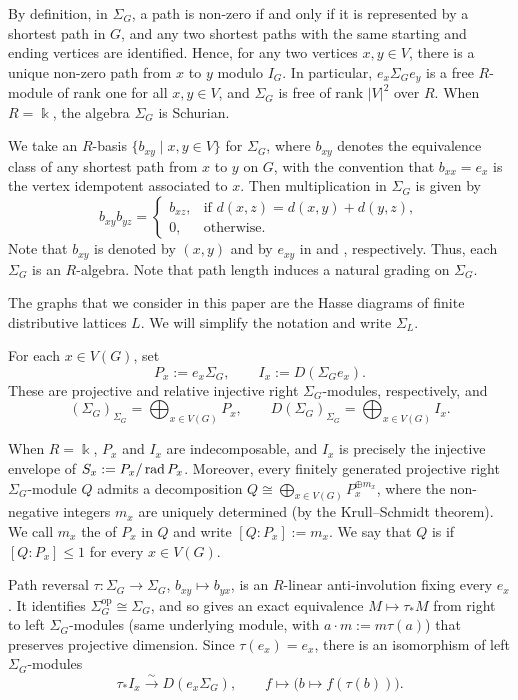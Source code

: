 \documentclass[a4paper,leqno]{amsart}
\begin{document}
By definition, in $\Sigma_G$, a path is non-zero if and only if it is represented by a shortest path in $G$, and any two shortest paths with the same starting and ending vertices are identified. Hence, for any two vertices $x,y\in V$, there is a unique non-zero path from $x$ to $y$ modulo $I_G$. In particular, $e_x\Sigma_Ge_y$ is a free $R$-module of rank one for all $x,y\in V$, and $\Sigma_G$ is free of rank $|V|^2$ over $R$. When $R=\Bbbk$, the algebra $\Sigma_G$ is Schurian.

We take an $R$-basis $\{b_{xy}\mid x,y\in V\}$ for $\Sigma_G$, where $b_{xy}$ denotes the equivalence class of any shortest path from $x$ to $y$ on $G$, with the convention that $b_{xx}=e_x$ is the vertex idempotent associated to $x$. Then multiplication in $\Sigma_G$ is given by
$$
b_{xy}b_{yz}=
\begin{cases}
b_{xz}, & \text{if } d(x,z)=d(x,y)+d(y,z),\\
0, & \text{otherwise}.
\end{cases}
$$
Note that $b_{xy}$ is denoted by $(x,y)$ and by $e_{xy}$ in \cite{AI24} and \cite{AW24}, respectively. Thus, each $\Sigma_G$ is an $R$-algebra.
Note that path length induces a natural grading on $\Sigma_G$. 

The graphs that we consider in this paper are the Hasse diagrams of finite distributive lattices $L$.  We will simplify the notation and write $\Sigma_L$.



For each $x\in V(G)$, set
\[
 P_x:=e_x\Sigma_G,
 \qquad
 I_x:=D(\Sigma_G e_x).
\]
These are projective and relative injective right $\Sigma_G$-modules, respectively, and
\[
 (\Sigma_G)_{\Sigma_G}=\bigoplus_{x\in V(G)}P_x,
 \qquad
 D(\Sigma_G)_{\Sigma_G}=\bigoplus_{x\in V(G)}I_x.
\]

When $R=\Bbbk$, $P_x$ and $I_x$ are indecomposable, and $I_x$ is precisely the injective envelope of $S_x:=P_x/\operatorname{rad} P_x$.
Moreover, every finitely generated projective right $\Sigma_G$-module $Q$ admits a decomposition $Q\cong\bigoplus_{x\in V(G)}P_x^{\oplus m_x}$, where the non-negative integers $m_x$ are uniquely determined (by the Krull--Schmidt theorem).  We call $m_x$ the  of $P_x$ in $Q$ and write $[Q:P_x]:=m_x$. We say that $Q$ is  if $[Q:P_x]\leq1$ for every $x\in V(G)$.

Path reversal $\tau\colon\Sigma_G\to\Sigma_G$, $b_{xy}\mapsto b_{yx}$, is an $R$-linear anti-involution fixing every $e_x$. It identifies $\Sigma_G^{\operatorname{op}}\cong\Sigma_G$, and so gives an exact equivalence $M\mapsto\tau_*M$ from right to left $\Sigma_G$-modules (same underlying module, with $a\cdot m:=m\tau(a)$) that preserves projective dimension.
Since $\tau(e_x)=e_x$, there is an isomorphism of left $\Sigma_G$-modules
\begin{equation}
 \tau_*I_x\xrightarrow{\sim}D(e_x\Sigma_G),
 \qquad f\longmapsto\bigl(b\longmapsto f(\tau(b))\bigr).
 \label{eq:tau-canonical-summands}
\end{equation}
\end{document}
